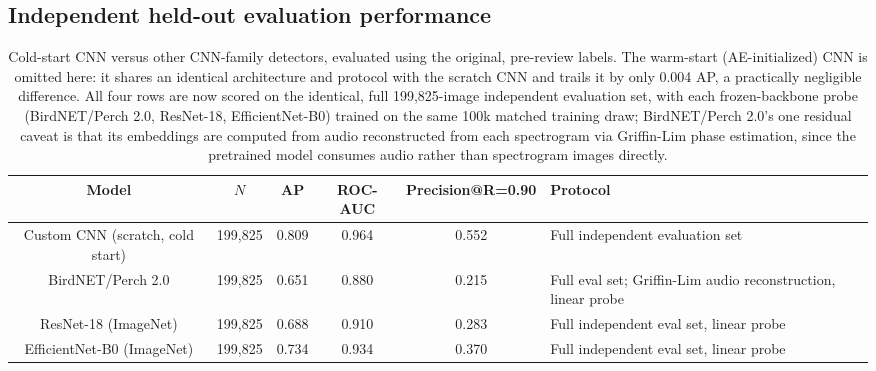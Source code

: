 \documentclass[preprint,NumberedRefs]{JASAnew}
\begin{document}



\subsection{Independent held-out evaluation performance}

\begin{table}[ht]
    \centering
    \small
    \caption{Cold-start CNN versus other CNN-family detectors, evaluated
    using the original, pre-review labels. The warm-start (AE-initialized)
    CNN is omitted here: it shares an identical architecture and protocol
    with the scratch CNN and trails it by only 0.004 AP, a practically
    negligible difference. All four rows are now scored on the identical,
    full 199,825-image independent evaluation set, with each frozen-backbone
    probe (BirdNET/Perch 2.0, ResNet-18, EfficientNet-B0) trained on the same
    100k matched training draw; BirdNET/Perch 2.0's one residual caveat is
    that its embeddings are computed from audio reconstructed from each
    spectrogram via Griffin-Lim phase estimation, since the pretrained model
    consumes audio rather than spectrogram images directly.}
    \label{tab:benchmark_results}
    \begin{ruledtabular}
    \begin{tabular}{cccccl}
        Model & $N$ & AP & ROC-AUC & Precision@R=0.90 & Protocol \\
        \hline
        \parbox[t]{0.2\textwidth}{Custom CNN (scratch, cold start)}
            & 199{,}825 & 0.809 & 0.964 & 0.552
            & \parbox[t]{0.28\textwidth}{Full independent evaluation set} \\[6pt]
        \parbox[t]{0.2\textwidth}{BirdNET/Perch 2.0}
            & 199{,}825 & 0.651 & 0.880 & 0.215
            & \parbox[t]{0.28\textwidth}{Full eval set; Griffin-Lim audio reconstruction, linear probe} \\[6pt]
        \parbox[t]{0.2\textwidth}{ResNet-18 (ImageNet)}
            & 199{,}825 & 0.688 & 0.910 & 0.283
            & \parbox[t]{0.28\textwidth}{Full independent eval set, linear probe} \\[6pt]
        \parbox[t]{0.2\textwidth}{EfficientNet-B0 (ImageNet)}
            & 199{,}825 & 0.734 & 0.934 & 0.370
            & \parbox[t]{0.28\textwidth}{Full independent eval set, linear probe} \\[3pt]
    \end{tabular}
    \end{ruledtabular}
\end{table}
\end{document}
